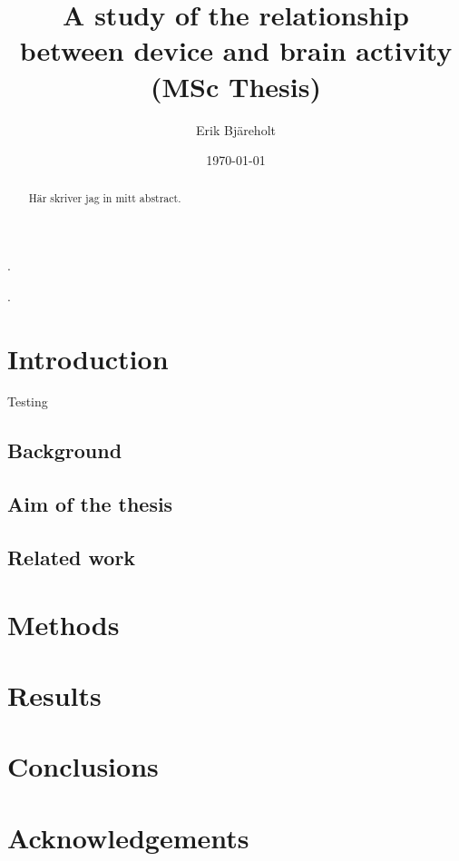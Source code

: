 \documentclass[a4paper]{article}
\title{A study of the relationship between device and brain activity (MSc Thesis)}
\author{Erik Bjäreholt}
\date{\today}
\begin{document}
\maketitle

\begin{abstract}
Här skriver jag in mitt abstract.
\end{abstract}

\pagebreak.\pagebreak

\tableofcontents

\pagebreak.\pagebreak

\section{Introduction}

Testing~\cite{einstein}

\subsection{Background}

\subsection{Aim of the thesis}

\subsection{Related work}

\section{Methods}

\section{Results}

\section{Conclusions}

\section*{Acknowledgements}
\end{document}
